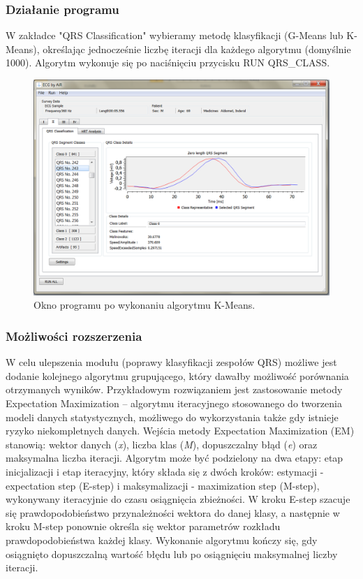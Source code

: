 \subsubsection{Działanie programu}
W zakładce "QRS Classification" wybieramy metodę klasyfikacji (G-Means lub K-Means), określając jednocześnie liczbę iteracji dla każdego algorytmu (domyślnie 1000). Algorytm wykonuje się po naciśnięciu przycisku RUN QRS\_CLASS.\newline
\begin{figure}[h]
\centering
\includegraphics[width=\textwidth,keepaspectratio] {QRS_CLASS/img/screen.png}
\caption{Okno programu po wykonaniu algorytmu K-Means.}
\label{fig:QRS_Screen}
\end{figure}

\subsubsection{Możliwości rozszerzenia}
W celu  ulepszenia modułu (poprawy klasyfikacji zespołów QRS) możliwe jest dodanie kolejnego algorytmu grupującego, który dawałby możliwość porównania otrzymanych wyników. Przykładowym rozwiązaniem jest zastosowanie metody Expectation Maximization – algorytmu iteracyjnego stosowanego do tworzenia modeli danych statystycznych, możliwego do wykorzystania także gdy istnieje ryzyko niekompletnych danych.
\newline\newline Wejścia metody Expectation Maximization (EM) stanowią: wektor danych (\textit{x}), liczba klas (\textit{M}), dopuszczalny błąd (\textit{e}) oraz maksymalna liczba iteracji. Algorytm może być podzielony na dwa etapy: etap inicjalizacji i etap iteracyjny, który składa się z dwóch kroków: estymacji - expectation step (E-step) i maksymalizacji - maximization step (M-step), wykonywany iteracyjnie do czasu osiągnięcia zbieżności.
\newline\newline W kroku E-step szacuje się prawdopodobieństwo przynależności wektora do danej klasy, a następnie w kroku M-step ponownie określa się wektor parametrów rozkładu prawdopodobieństwa każdej klasy. Wykonanie algorytmu kończy się, gdy osiągnięto dopuszczalną wartość błędu lub po osiągnięciu maksymalnej liczby iteracji.

